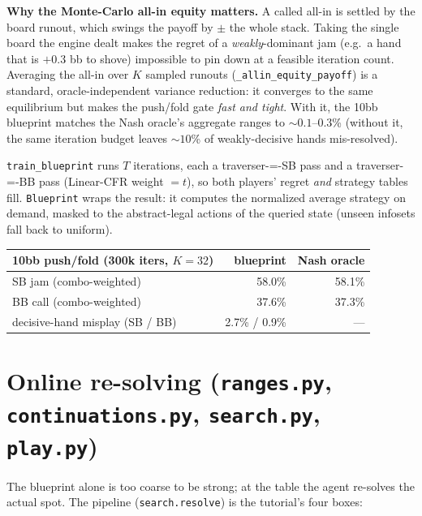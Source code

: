 \documentclass[11pt,a4paper]{article}
\newcommand{\file}[1]{\textcolor{accent}{\texttt{#1}}}
\newcommand{\fn}[1]{\texttt{#1}}
\begin{document}
\begin{intuition}
\textbf{Why the Monte-Carlo all-in equity matters.} A called all-in is settled by
the board runout, which swings the payoff by $\pm$ the whole stack. Taking the
single board the engine dealt makes the regret of a \emph{weakly}-dominant jam
(e.g.\ a hand that is $+0.3$ bb to shove) impossible to pin down at a feasible
iteration count. Averaging the all-in over $K$ sampled runouts
(\fn{\_allin\_equity\_payoff}) is a standard, oracle-independent variance
reduction: it converges to the same equilibrium but makes the push/fold gate
\emph{fast and tight}. With it, the 10bb blueprint matches the Nash oracle's
aggregate ranges to $\sim 0.1$--$0.3$\% (without it, the same iteration budget
leaves $\sim 10$\% of weakly-decisive hands mis-resolved).
\end{intuition}

\fn{train\_blueprint} runs $T$ iterations, each a traverser-=-SB pass and a
traverser-=-BB pass (Linear-CFR weight $=t$), so both players' regret \emph{and}
strategy tables fill. \fn{Blueprint} wraps the result: it computes the normalized
average strategy on demand, masked to the abstract-legal actions of the queried
state (unseen infosets fall back to uniform).

\begin{center}\small
\begin{tabular}{@{}lrr@{}}
\toprule
10bb push/fold (300k iters, $K{=}32$) & blueprint & Nash oracle \\
\midrule
SB jam (combo-weighted) & 58.0\% & 58.1\% \\
BB call (combo-weighted) & 37.6\% & 37.3\% \\
decisive-hand misplay (SB / BB) & 2.7\% / 0.9\% & --- \\
\bottomrule
\end{tabular}
\end{center}

\section{Online re-solving (\file{ranges.py}, \file{continuations.py}, \file{search.py}, \file{play.py})}

The blueprint alone is too coarse to be strong; at the table the agent re-solves
the actual spot. The pipeline (\fn{search.resolve}) is the tutorial's four boxes:
\end{document}
